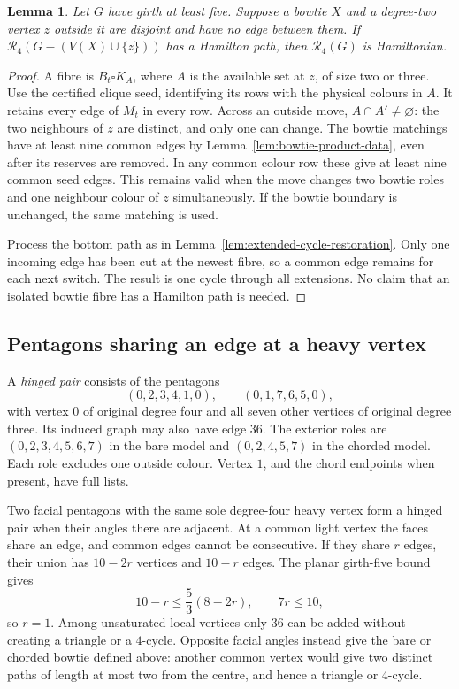 \documentclass[11pt]{article}
\newtheorem{lemma}[theorem]{Lemma}
\theoremstyle{remark}
\newcommand{\R}{\mathcal R}
\numberwithin{equation}{section}
\numberwithin{table}{section}
\begin{document}
\begin{lemma}\label{lem:bowtie-degree-two}
Let $G$ have girth at least five. Suppose a bowtie $X$ and a degree-two
vertex $z$ outside it are disjoint and have no edge between them. If
$\R_4(G-(V(X)\cup\{z\}))$ has a Hamilton path, then $\R_4(G)$ is
Hamiltonian.
\end{lemma}
\begin{proof}
A fibre is $B_t\square K_A$, where $A$ is the available set at $z$,
of size two or three. Use the certified clique seed, identifying its
rows with the physical colours in $A$. It retains every edge of $M_t$
in every row. Across an outside move, $A\cap A'\ne\varnothing$:
the two neighbours of $z$ are distinct, and only one can change.
The bowtie matchings have at least nine common edges by
Lemma~\ref{lem:bowtie-product-data}, even after its reserves are
removed. In any common colour row these give at least nine common
seed edges. This remains valid when the move changes two bowtie
roles and one neighbour colour of $z$ simultaneously. If the bowtie
boundary is unchanged, the same matching is used.

Process the bottom path as in
Lemma~\ref{lem:extended-cycle-restoration}. Only one incoming edge
has been cut at the newest fibre, so a common edge remains for each
next switch. The result is one cycle through all extensions. No
claim that an isolated bowtie fibre has a Hamilton path is needed.
\end{proof}


\subsection{Pentagons sharing an edge at a heavy vertex}
A \emph{hinged pair} consists of the pentagons
\[
 (0,2,3,4,1,0),\qquad (0,1,7,6,5,0),
\]
with vertex $0$ of original degree four and all seven other vertices
of original degree three. Its induced graph may also have edge $36$.
The exterior roles are $(0,2,3,4,5,6,7)$ in the bare model and
$(0,2,4,5,7)$ in the chorded model. Each role excludes one outside
colour. Vertex $1$, and the chord endpoints when present, have full lists.

Two facial pentagons with the same sole degree-four heavy vertex
form a hinged pair when their angles there are adjacent. At a common
light vertex the faces share an edge, and common edges cannot be
consecutive. If they share $r$ edges, their union has $10-2r$ vertices
and $10-r$ edges. The planar girth-five bound gives
\[
 10-r\le\frac53(8-2r),\qquad 7r\le10,
\]
so $r=1$. Among unsaturated local vertices only $36$ can be added
without creating a triangle or a $4$-cycle. Opposite facial angles
instead give the bare or chorded bowtie defined above: another common
vertex would give two distinct paths of length at most two from the
centre, and hence a triangle or $4$-cycle.
\end{document}
